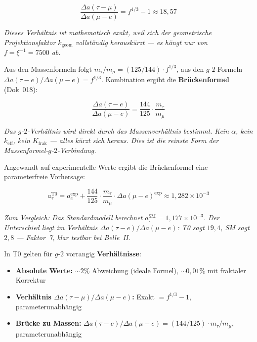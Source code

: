 	\begin{equation}
		\frac{\Delta a(\tau - \mu)}{\Delta a(\mu - e)} = f^{1/3} - 1 \approx 18{,}57
	\end{equation}
	
	\textit{Dieses Verhältnis ist mathematisch exakt, weil sich der geometrische Projektionsfaktor \(k_{\text{geom}}\) vollständig herauskürzt — es hängt nur von \(f = \xi^{-1} = 7500\) ab.}
	
	Aus den Massenformeln folgt \(m_\tau/m_\mu = (125/144) \cdot f^{1/3}\), aus den \(g\)-\(2\)-Formeln \(\Delta a(\tau{-}e)/\Delta a(\mu{-}e) = f^{1/3}\). Kombination ergibt die \textbf{Brückenformel} (Dok~018):
	
	\begin{equation}
		\boxed{\frac{\Delta a(\tau{-}e)}{\Delta a(\mu{-}e)} = \frac{144}{125} \cdot \frac{m_\tau}{m_\mu}}
	\end{equation}
	
	\textit{Das \(g\)-\(2\)-Verhältnis wird direkt durch das Massenverhältnis bestimmt. Kein \(\alpha\), kein \(k_{\text{eff}}\), kein \(K_{\text{frak}}\) — alles kürzt sich heraus. Dies ist die reinste Form der Massenformel-\(g\)-\(2\)-Verbindung.}
	
	Angewandt auf experimentelle Werte ergibt die Brückenformel eine parameterfreie Vorhersage:
	
	\begin{equation}
		a_\tau^{\text{T0}} = a_e^{\text{exp}} + \frac{144}{125} \cdot \frac{m_\tau}{m_\mu} \cdot \Delta a(\mu{-}e)^{\text{exp}} \approx 1{,}282 \times 10^{-3}
	\end{equation}
	
	\textit{Zum Vergleich: Das Standardmodell berechnet \(a_\tau^{\text{SM}} = 1{,}177 \times 10^{-3}\). Der Unterschied liegt im Verhältnis \(\Delta a(\tau{-}e)/\Delta a(\mu{-}e)\): T0 sagt \(19{,}4\), SM sagt \(2{,}8\) — Faktor~7, klar testbar bei Belle~II.}
	
	In T0 gelten für \(g\)-\(2\) vorrangig \textbf{Verhältnisse}:
	\begin{itemize}[leftmargin=*]
		\item \textbf{Absolute Werte:} \(\sim 2\%\) Abweichung (ideale Formel), \(\sim 0{,}01\%\) mit fraktaler Korrektur
		\item \textbf{Verhältnis \(\Delta a(\tau{-}\mu)/\Delta a(\mu{-}e)\):} Exakt \(= f^{1/3} - 1\), parameterunabhängig
		\item \textbf{Brücke zu Massen:} \(\Delta a(\tau{-}e)/\Delta a(\mu{-}e) = (144/125) \cdot m_\tau/m_\mu\), parameterunabhängig
	\end{itemize}
	


